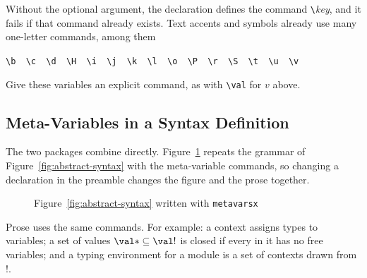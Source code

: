 \documentclass{article}
\begin{document}
Without the optional argument, the declaration defines the command
\verb|\|\textit{key}, and it fails if that command already exists. Text accents and symbols already use many one-letter
commands, among them
\begin{center}
  \verb|\b  \c  \d  \H  \i  \j  \k  \l  \o  \P  \r  \S  \t  \u  \v|
\end{center}
Give these variables an explicit command, as with \verb|\val| for $v$
above.

\subsection{Meta-Variables in a Syntax Definition}

The two packages combine directly. Figure~\ref{fig:metavars-syntax}
repeats the grammar of Figure~\ref{fig:abstract-syntax} with the
meta-variable commands, so changing a declaration in the preamble
changes the figure and the prose together.

\begin{figure}[h]
  \begin{syntax}

    \category[Expressions]{\e \in \e!}
    \alternative{\x}
    \alternative{\n}

    \category[Values]{\val \in \val!}

    \separate

    \category[Types]{\ty \in \ty!}

    \category[Contexts]{\ctx \in \ctx!}
  \end{syntax}

  \caption{Figure~\ref{fig:abstract-syntax} written with \texttt{metavarsx}}
  \label{fig:metavars-syntax}
\end{figure}

Prose uses the same commands. For example: a context \ctx assigns types
to variables; a set of values $\val* \subseteq \val!$ is closed if every
\val in it has no free variables; and a typing environment for a module
is a set of contexts \ctx* drawn from \ctx!.
\end{document}
